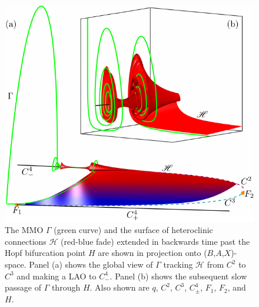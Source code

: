 \documentclass{ws-ijbc}
\begin{document}
\begin{figure}[H]
\centering
\includegraphics[]{./figures/MKMO_13.pdf}
\caption{The MMO $\Gamma$ (green curve) and the surface of heteroclinic connections $\mathscr{H}$ (red-blue fade) extended in backwards time past the Hopf bifurcation point $H$ are shown in projection onto ($B$,$A$,$X$)-space.  Panel (a) shows the global view of $\Gamma$ tracking $\mathscr{H}$ from $C^2$ to $C^3$ and making a LAO to $C^4_-$.  Panel (b) shows the subsequent slow passage of $\Gamma$ through $H$.  Also shown are $q$, $C^2$, $C^3$, $C^4_\pm$, $F_1$, $F_2$, and $H$.}
\label{figure_13}
\end{figure}
\end{document}
